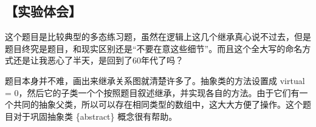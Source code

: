 \subsection*{【实验体会】}
这个题目是比较典型的多态练习题，虽然在逻辑上这几个继承真心说不过去，但是题目终究是题目，和现实区别还是“不要在意这些细节”。而且这个全大写的命名方式还是让我恶心了半天，是回到了60年代了吗？

题目本身并不难，画出来继承关系图就清楚许多了。抽象类的方法设置成 virtual = 0，然后它的子类一个个按照题目叙述继承，并实现各自的方法。由于它们有一个共同的抽象父类，所以可以存在相同类型的数组中，这大大方便了操作。这个题目对于巩固抽象类 \{abstract\} 概念很有帮助。
